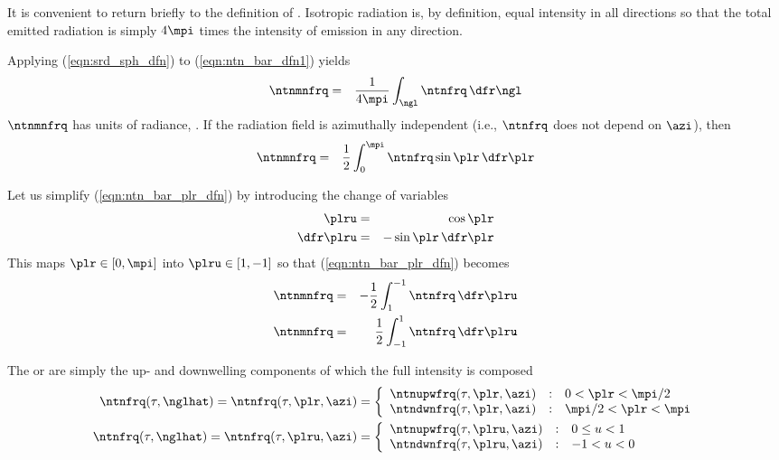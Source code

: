 \documentclass[12pt]{article}
\begin{document}
It is convenient to return briefly to the definition of 
.
Isotropic radiation is, by definition, equal intensity in all
directions so that the total emitted radiation is simply $4\mpi$  
times the intensity of emission in any direction.

Applying (\ref{eqn:srd_sph_dfn}) to (\ref{eqn:ntn_bar_dfn1}) yields
\begin{eqnarray}
\ntnmnfrq & = & \frac{1}{4 \mpi} \int_{\ngl} \ntnfrq \,\dfr\ngl
\label{eqn:ntn_bar_dfn}
\end{eqnarray}
$\ntnmnfrq$ has units of radiance, \wxmSsrhz.
If the radiation field is azimuthally independent (i.e., $\ntnfrq$
does not depend on $\azi$), then 
\begin{eqnarray}
\ntnmnfrq & = & \frac{1}{2} \int_{0}^{\mpi} \ntnfrq \sin \plr \,\dfr\plr
\label{eqn:ntn_bar_plr_dfn}
\end{eqnarray}

Let us simplify (\ref{eqn:ntn_bar_plr_dfn}) by introducing the change
of variables 
\begin{eqnarray}
\plru & = & \cos \plr \\
\dfr\plru & = & -\sin \plr \,\dfr\plr
\label{eqn:plru_dfn}
\label{eqn:cov_plru}
\end{eqnarray}
This maps $\plr \in [0, \mpi]$ into $\plru \in [1, -1]$ so that
(\ref{eqn:ntn_bar_plr_dfn}) becomes
\begin{eqnarray}
\ntnmnfrq & = & -\frac{1}{2} \int_{1}^{-1} \ntnfrq \,\dfr\plru \nonumber \\
\ntnmnfrq & = &  \frac{1}{2} \int_{-1}^{1} \ntnfrq \,\dfr\plru
\label{eqn:ntn_bar_plru_dfn}
\end{eqnarray}

The  or  are simply the up- and downwelling components 
of which the full intensity is composed
\begin{subequations}
\label{eqn:ntn_hms_dfn}
\begin{align}
\ntnfrq(\tau,\nglhat) = \ntnfrq(\tau,\plr,\azi) & = \left\{ 
\begin{array}{r@{\quad:\quad}ll}
\ntnupwfrq(\tau,\plr,\azi) & 0 < \plr < \mpi/2 \\
\ntndwnfrq(\tau,\plr,\azi) & \mpi/2 < \plr < \mpi
\end{array} \right. \\
\ntnfrq(\tau,\nglhat) = \ntnfrq(\tau,\plru,\azi) & = \left\{ 
\begin{array}{r@{\quad:\quad}l}
\ntnupwfrq(\tau,\plru,\azi) & 0 \le u < 1 \\
\ntndwnfrq(\tau,\plru,\azi) & -1 < u < 0
\end{array} \right.
\end{align}
\end{subequations}
\end{document}
